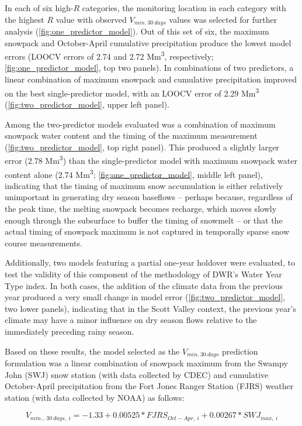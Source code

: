 \documentclass[
]{article}
\begin{document}
In each of six high-\(R\) categories, the monitoring location in each
category with the highest \(R\) value with observed \(V_{min.~30~days}\)
values was selected for further analysis
(\autoref{fig:one_predictor_model}). Out of this set of six, the maximum
snowpack and October-April cumulative precipitation produce the lowest
model errors (LOOCV errors of 2.74 and 2.72 Mm\textsuperscript{3},
respectively; \autoref{fig:one_predictor_model}, top two panels). In
combinations of two predictors, a linear combination of maximum snowpack
and cumulative precipitation improved on the best single-predictor
model, with an LOOCV error of 2.29 Mm\textsuperscript{3}
(\autoref{fig:two_predictor_model}, upper left panel).

Among the two-predictor models evaluated was a combination of maximum
snowpack water content and the timing of the maximum measurement
(\autoref{fig:two_predictor_model}, top right panel). This produced a
slightly larger error (2.78 Mm\textsuperscript{3}) than the
single-predictor model with maximum snowpack water content alone (2.74
Mm\textsuperscript{3}; \autoref{fig:one_predictor_model}, middle left
panel), indicating that the timing of maximum snow accumulation is
either relatively unimportant in generating dry season baseflows --
perhaps because, regardless of the peak time, the melting snowpack
becomes recharge, which moves slowly enough through the subsurface to
buffer the timing of snowmelt -- or that the actual timing of snowpack
maximum is not captured in temporally sparse snow course measurements.

Additionally, two models featuring a partial one-year holdover were
evaluated, to test the validity of this component of the methodology of
DWR's Water Year Type index. In both cases, the addition of the climate
data from the previous year produced a very small change in model error
(\autoref{fig:two_predictor_model}, two lower panels), indicating that
in the Scott Valley context, the previous year's climate may have a
minor influence on dry season flows relative to the immediately
preceding rainy season.

Based on these results, the model selected as the \(V_{min.~30~days}\)
prediction formulation was a linear combination of snowpack maximum from
the Swampy John (SWJ) snow station (with data collected by CDEC) and
cumulative October-April precipitation from the Fort Jones Ranger
Station (FJRS) weather station (with data collected by NOAA) as follows:

\[V_{min.,~30~days,~i} = -1.33 + 0.00525 * FJRS_{Oct-Apr,~i}+0.00267*SWJ_{max,~i}\]
\end{document}
